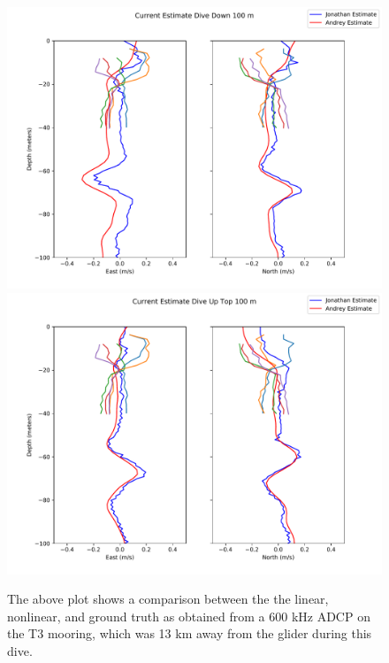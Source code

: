 \begin{figure}%
  \includegraphics[width=\columnwidth]{./figs/down100.pdf}
  \includegraphics[width=\columnwidth]{./figs/up100.pdf}
  \caption{The above plot shows a comparison between the the linear, nonlinear, and ground truth as obtained from a 600 kHz ADCP on the T3 mooring, which was 13 km away from the glider during this dive.}
  \label{fig.mooring}
\end{figure}








